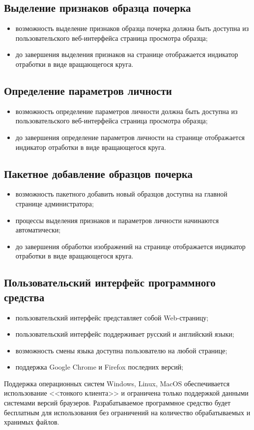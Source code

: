 \subsection{Выделение признаков образца почерка}
\label{sec:freq:extract_features}
\begin{itemize}
	\item возможность выделение признаков образца почерка должна быть доступна из пользовательского веб-интерфейса страница просмотра образца;
	\item до завершения выделения признаков на странице отображается индикатор отработки в виде вращающегося круга.
\end{itemize}

\subsection{Определение параметров личности}
\label{sec:freq:psiho_analysis}
\begin{itemize}
	\item возможность определение параметров личности должна быть доступна из пользовательского веб-интерфейса страница просмотра образца;
	\item до завершения определение параметров личности на странице отображается индикатор отработки в виде вращающегося круга.
\end{itemize}

\subsection{Пакетное добавление образцов почерка}
\label{sec:freq:package_add}
\begin{itemize}
	\item возможность пакетного добавить новый образцов доступна на главной странице администратора;
	\item процессы выделения признаков и параметров личности начинаются автоматически;
	\item до завершения обработки изображений на странице отображается индикатор отработки в виде вращающегося круга.
\end{itemize}

\subsection{Пользовательский интерфейс программного средства}
\begin{itemize}
	\item пользовательский интерфейс представляет собой Web-страницу;
	\item пользовательский интерфейс поддерживает русский и английский языки;
	\item возможность смены языка доступна пользователю на любой странице;
	\item поддержка Google Chrome и Firefox последних версий;
\end{itemize}

Поддержка операционных систем Windows, Linux, MacOS обеспечивается использование <<тонкого клиента>> и ограничена только поддержкой данными системами версий браузеров.
Разрабатываемое программное средство будет бесплатным для использования без ограничений на количество обрабатываемых и хранимых файлов.